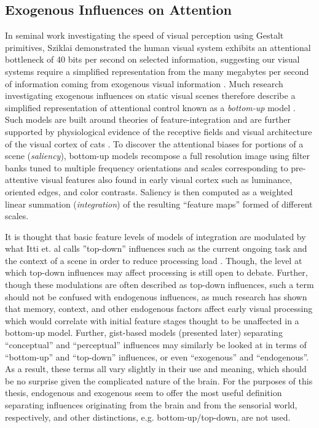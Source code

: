 \documentclass[a4paper,11pt,final]{ThesisStyle}
\begin{document}
\subsection{Exogenous Influences on Attention}

In seminal work investigating the speed of visual perception using Gestalt primitives, Sziklai demonstrated the human visual system exhibits an attentional bottleneck of 40 bits per second on selected information, suggesting our visual systems require a simplified representation from the many megabytes per second of information coming from exogenous visual information \cite{Sziklai1956,Merrill1968}.  Much research investigating exogenous influences on static visual scenes therefore describe a simplified representation of attentional control known as a \textit{bottom-up} model \cite{Koch1985,Itti1998,Wolfe1989,Itti2001}.  Such models are built around theories of feature-integration \cite{Treisman1980} and are further supported by physiological evidence of the receptive fields and visual architecture of the visual cortex of cats \cite{Hubel1962}.  To discover the attentional biases for portions of a scene (\textit{saliency}), bottom-up models recompose a full resolution image using filter banks tuned to multiple frequency orientations and scales corresponding to pre-attentive visual features also found in early visual cortex such as luminance, oriented edges, and color contrasts.  Saliency is then computed as a weighted linear summation (\textit{integration}) of the resulting ``feature maps'' formed of different scales. 

It is thought that basic feature levels of models of integration are modulated by what Itti et. al calls ''top-down'' influences \cite{Itti2001} such as the current ongoing task \cite{Yarbus1967,Smith2011a} and the context of a scene in order to reduce processing load \cite{Henderson2003,Torralba2006}.  Though, the level at which top-down influences may affect processing is still open to debate.  Further, though these modulations are often described as top-down influences, such a term should not be confused with endogenous influences, as much research has shown that memory, context, and other endogenous factors affect early visual processing \cite{Tatler2011} which would correlate with initial feature stages thought to be unaffected in a bottom-up model.  Further, gist-based models (presented later) separating ``conceptual'' and ``perceptual'' influences may similarly be looked at in terms of ``bottom-up'' and ``top-down'' influences, or even ``exogenous'' and ``endogenous''.  As a result, these terms all vary slightly in their use and meaning, which should be no surprise given the complicated nature of the brain.  For the purposes of this thesis, endogenous and exogenous seem to offer the most useful definition separating influences originating from the brain and from the sensorial world, respectively, and other distinctions, e.g. bottom-up/top-down, are not used. 
\end{document}
